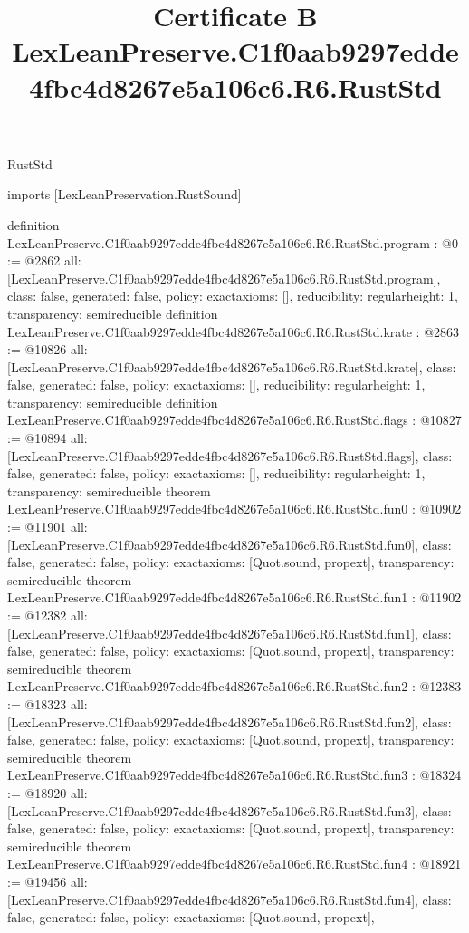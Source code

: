 \begin{lexlean}{RustStd}
\title{Certificate B LexLeanPreserve.C1f0aab9297edde4fbc4d8267e5a106c6.R6.RustStd}
\begin{coremodule}
imports [LexLeanPreservation.RustSound]

definition LexLeanPreserve.C1f0aab9297edde4fbc4d8267e5a106c6.R6.RustStd.program : @0 := @2862 {
  all: [LexLeanPreserve.C1f0aab9297edde4fbc4d8267e5a106c6.R6.RustStd.program],
  class: false,
  generated: false,
  policy: exact{axioms: []},
  reducibility: regular{height: 1},
  transparency: semireducible
}
definition LexLeanPreserve.C1f0aab9297edde4fbc4d8267e5a106c6.R6.RustStd.krate : @2863 := @10826 {
  all: [LexLeanPreserve.C1f0aab9297edde4fbc4d8267e5a106c6.R6.RustStd.krate],
  class: false,
  generated: false,
  policy: exact{axioms: []},
  reducibility: regular{height: 1},
  transparency: semireducible
}
definition LexLeanPreserve.C1f0aab9297edde4fbc4d8267e5a106c6.R6.RustStd.flags : @10827 := @10894 {
  all: [LexLeanPreserve.C1f0aab9297edde4fbc4d8267e5a106c6.R6.RustStd.flags],
  class: false,
  generated: false,
  policy: exact{axioms: []},
  reducibility: regular{height: 1},
  transparency: semireducible
}
theorem LexLeanPreserve.C1f0aab9297edde4fbc4d8267e5a106c6.R6.RustStd.fun0 : @10902 := @11901 {
  all: [LexLeanPreserve.C1f0aab9297edde4fbc4d8267e5a106c6.R6.RustStd.fun0],
  class: false,
  generated: false,
  policy: exact{axioms: [Quot.sound, propext]},
  transparency: semireducible
}
theorem LexLeanPreserve.C1f0aab9297edde4fbc4d8267e5a106c6.R6.RustStd.fun1 : @11902 := @12382 {
  all: [LexLeanPreserve.C1f0aab9297edde4fbc4d8267e5a106c6.R6.RustStd.fun1],
  class: false,
  generated: false,
  policy: exact{axioms: [Quot.sound, propext]},
  transparency: semireducible
}
theorem LexLeanPreserve.C1f0aab9297edde4fbc4d8267e5a106c6.R6.RustStd.fun2 : @12383 := @18323 {
  all: [LexLeanPreserve.C1f0aab9297edde4fbc4d8267e5a106c6.R6.RustStd.fun2],
  class: false,
  generated: false,
  policy: exact{axioms: [Quot.sound, propext]},
  transparency: semireducible
}
theorem LexLeanPreserve.C1f0aab9297edde4fbc4d8267e5a106c6.R6.RustStd.fun3 : @18324 := @18920 {
  all: [LexLeanPreserve.C1f0aab9297edde4fbc4d8267e5a106c6.R6.RustStd.fun3],
  class: false,
  generated: false,
  policy: exact{axioms: [Quot.sound, propext]},
  transparency: semireducible
}
theorem LexLeanPreserve.C1f0aab9297edde4fbc4d8267e5a106c6.R6.RustStd.fun4 : @18921 := @19456 {
  all: [LexLeanPreserve.C1f0aab9297edde4fbc4d8267e5a106c6.R6.RustStd.fun4],
  class: false,
  generated: false,
  policy: exact{axioms: [Quot.sound, propext]},
}
\end{coremodule}
\end{lexlean}
